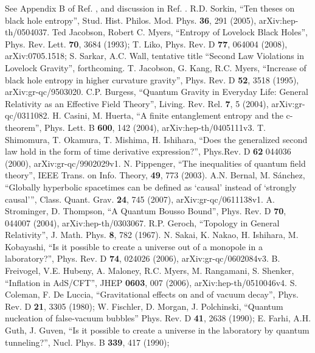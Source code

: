 \documentclass{article}
\begin{document}
\begin{thebibliography}{99}
See Appendix B of Ref. \cite{FPST}, and discussion in Ref. \cite{10proofs}.
R.D. Sorkin, ``Ten theses on black hole entropy'', Stud. Hist. Philos. Mod. Phys. \textbf{36}, 291 (2005), arXiv:hep-th/0504037.
Ted Jacobson, Robert C. Myers, ``Entropy of Lovelock Black Holes'', Phys. Rev. Lett. \textbf{70}, 3684 (1993); T. Liko, Phys. Rev. D \textbf{77}, 064004 (2008), arXiv:0705.1518;
S. Sarkar, A.C. Wall, tentative title ``Second Law Violations in Lovelock Gravity'', forthcoming.
T. Jacobson, G. Kang, R.C. Myers, ``Increase of black hole entropy in higher curvature gravity'', Phys. Rev. D \textbf{52}, 3518 (1995), arXiv:gr-qc/9503020.
C.P. Burgess, ``Quantum Gravity in Everyday Life: General Relativity as an Effective Field Theory'', Living. Rev. Rel. \textbf{7}, 5 (2004), arXiv:gr-qc/0311082.
H. Casini, M. Huerta, ``A finite entanglement entropy and the c-theorem'', Phys. Lett. B \textbf{600}, 142 (2004), arXiv:hep-th/0405111v3.
T. Shimomura, T. Okamura, T. Mishima, H. Ishihara, ``Does the generalized second law hold in the form of time derivative expression?'', Phys.Rev. D \textbf{62} 044036 (2000), arXiv:gr-qc/9902029v1.
N. Pippenger, ``The inequalities of quantum field theory'', IEEE Trans. on Info. Theory, \textbf{49}, 773 (2003).
A.N. Bernal, M. S\'{a}nchez, ``Globally hyperbolic spacetimes can be defined as `causal' instead of `strongly causal'\phantom{.}'',
Class. Quant. Grav. \textbf{24}, 745 (2007), arXiv:gr-qc/0611138v1.
A. Strominger, D. Thompson, ``A Quantum Bousso Bound'', Phys. Rev. D \textbf{70}, 044007 (2004), arXiv:hep-th/0303067.
R.P. Geroch, ``Topology in General Relativity'', J. Math. Phys. \textbf{8}, 782 (1967).
N. Sakai, K. Nakao, H. Ishihara, M. Kobayashi, ``Is it possible to create a universe out of a monopole in a laboratory?'', Phys. Rev. D \textbf{74}, 024026 (2006), arXiv:gr-qc/0602084v3.
B. Freivogel, V.E. Hubeny, A. Maloney, R.C. Myers, M. Rangamani, S. Shenker, ``Inflation in AdS/CFT'', JHEP \textbf{0603}, 007 (2006),
arXiv:hep-th/0510046v4.
S. Coleman, F. De Luccia, ``Gravitational effects on and of vacuum decay'', Phys. Rev. D \textbf{21}, 3305 (1980);
W. Fischler, D. Morgan, J. Polchinski, ``Quantum nucleation of false-vacuum bubbles'' Phys. Rev. D \textbf{41}, 2638 (1990);
E. Farhi, A.H. Guth, J. Guven, ``Is it possible to create a universe in the laboratory by quantum tunneling?'', 
Nucl. Phys. B \textbf{339}, 417 (1990);

\end{thebibliography}
\end{document}
